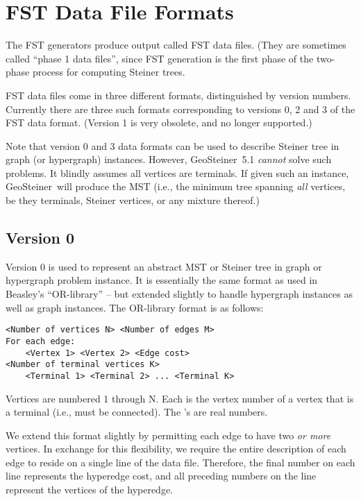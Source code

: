 \documentclass[12pt,twoside,letterpaper]{article}
\def\code#1{{\ttfamily #1}}
\def\geosteiner{Geo\-Steiner}
\newcommand{\GeoSteinerCurrentVersion}{5.1}
\begin{document}



\section{FST Data File Formats}
\label{sec:fst_formats}

The FST generators produce output called FST data files.  (They are
sometimes called ``phase 1 data files'', since FST generation is the first
phase of the two-phase process for computing Steiner trees.

FST data files come in three different formats, distinguished by version
numbers.  Currently there are three such formats corresponding to
versions 0, 2 and 3 of the FST data format.  (Version 1 is very
obsolete, and no longer supported.)

Note that version 0 and 3 data formats can be used to describe Steiner
tree in graph (or hypergraph) instances.  However,
\geosteiner~\GeoSteinerCurrentVersion{}
{\em cannot} solve such problems. It blindly assumes all vertices are
terminals.  If given such an instance, \geosteiner\ will produce the MST
(i.e., the minimum tree spanning {\em all} vertices, be they terminals,
Steiner vertices, or any mixture thereof.)

\subsection*{Version 0}

Version 0 is used to represent an abstract MST or Steiner tree in graph
or hypergraph problem instance.  It is essentially the same format as
used in Beasley's ``OR-library'' -- but extended slightly to handle
hypergraph instances as well as graph instances.  The OR-library format
is as follows:

{\footnotesize
\begin{verbatim}
<Number of vertices N> <Number of edges M>
For each edge:
    <Vertex 1> <Vertex 2> <Edge cost>
<Number of terminal vertices K>
    <Terminal 1> <Terminal 2> ... <Terminal K>
\end{verbatim}
}

Vertices are numbered 1 through N.  Each \code{<Terminal i>} is the vertex
number of a vertex that is a terminal (i.e., must be connected).
The \code{<Edge cost>}'s are real numbers.

We extend this format slightly by permitting each edge to have two
{\em or more} vertices.  In exchange for this flexibility, we require the entire
description of each edge to reside on a single line of the data file.
Therefore, the final number on each line represents the hyperedge cost,
and all preceding numbers on the line represent the vertices of the
hyperedge.
\end{document}
